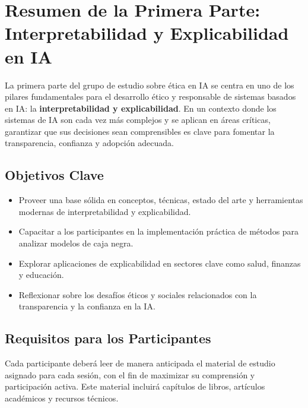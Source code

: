 \chapter*{Resumen de la Primera Parte: Interpretabilidad y Explicabilidad en IA}

La primera parte del grupo de estudio sobre ética en IA se centra en uno de los pilares fundamentales para el desarrollo ético y responsable de sistemas basados en IA: la \textbf{interpretabilidad y explicabilidad}. En un contexto donde los sistemas de IA son cada vez más complejos y se aplican en áreas críticas, garantizar que sus decisiones sean comprensibles es clave para fomentar la transparencia, confianza y adopción adecuada.

\section*{Objetivos Clave}
\begin{itemize}
    \item Proveer una base sólida en conceptos, técnicas, estado del arte y herramientas modernas de interpretabilidad y explicabilidad.
    \item Capacitar a los participantes en la implementación práctica de métodos para analizar modelos de caja negra.
    \item Explorar aplicaciones de explicabilidad en sectores clave como salud, finanzas y educación.
    \item Reflexionar sobre los desafíos éticos y sociales relacionados con la transparencia y la confianza en la IA.
\end{itemize}

\section*{Requisitos para los Participantes}
Cada participante deberá leer de manera anticipada el material de estudio asignado para cada sesión, con el fin de maximizar su comprensión y participación activa. Este material incluirá capítulos de libros, artículos académicos y recursos técnicos.

